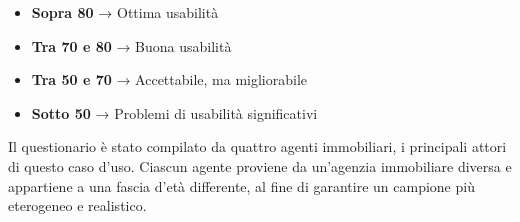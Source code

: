 \begin{itemize}
    \item \textbf{Sopra 80} → Ottima usabilità
    \item \textbf{Tra 70 e 80} → Buona usabilità
    \item \textbf{Tra 50 e 70} → Accettabile, ma migliorabile
    \item \textbf{Sotto 50} → Problemi di usabilità significativi
\end{itemize}
Il questionario è stato compilato da quattro agenti immobiliari, i principali attori di questo caso d’uso. Ciascun agente proviene da un’agenzia immobiliare diversa e appartiene a una fascia d’età differente, al fine di garantire un campione più eterogeneo e realistico. 

\vspace{0.5cm}

